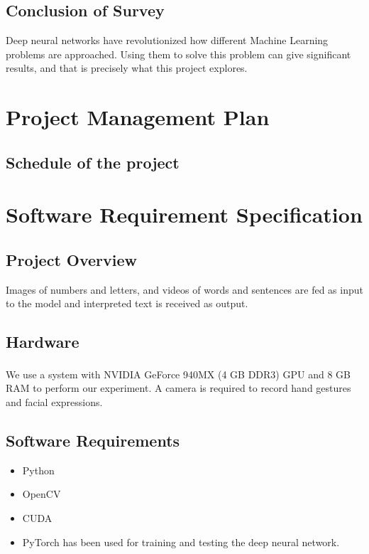 \documentclass[12pt,oneside,a4paper]{article}
\newcommand\todo[1]{\textcolor{blue}{#1}}
\newcommand\placeholder[1]{\todo{\lipsum[#1]}}
\begin{document}
		\subsection{Conclusion of Survey}
			Deep neural networks have revolutionized how different Machine Learning problems are approached. Using them to solve this problem can give significant results, and that is precisely what this project explores.

	\section{Project Management Plan}

		\subsection{Schedule of the project}
			\placeholder{2}

	\section{Software Requirement Specification}

		\subsection{Project Overview}
			Images of numbers and letters, and videos of words and sentences are fed as input to the model and interpreted text is received as output.

		\subsection{Hardware}
			We use a system with NVIDIA\textsuperscript{\textregistered} GeForce\textsuperscript{\textregistered} 940MX (4 GB DDR3) GPU and 8 GB RAM to perform our experiment. A camera is required to record hand gestures and facial expressions.

		\subsection{Software Requirements}

			\begin{itemize}
				\item Python
				\item OpenCV
				\item CUDA
				\item PyTorch has been used for training and testing the deep neural network.
			\end{itemize}
\end{document}
